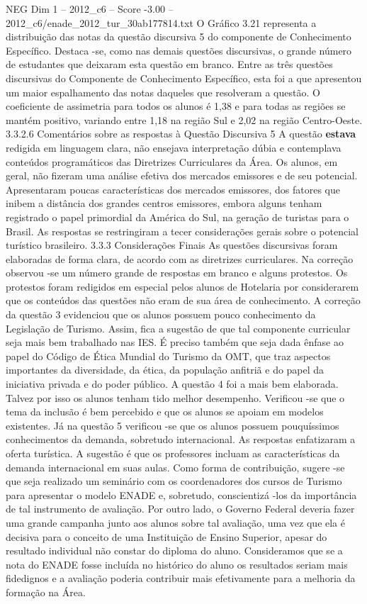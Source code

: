 \begin{textsample}{NEG Dim 1 – 2012\_c6 – Score -3.00 – 2012\_c6/enade\_2012\_tur\_30ab177814.txt}
O Gráfico 3.21 representa a distribuição das notas da questão discursiva 5 do componente de Conhecimento Específico.
Destaca -se, como nas demais questões discursivas, o grande número de estudantes que deixaram esta questão em branco.
Entre as três questões discursivas do Componente de Conhecimento Específico, esta foi a que apresentou um maior espalhamento das notas daqueles que resolveram a questão.
O coeficiente de assimetria para todos os alunos é 1,38 e para todas as regiões se mantém positivo, variando entre 1,18 na região Sul e 2,02 na região Centro-Oeste. 3.3.2.6 Comentários sobre as respostas à Questão Discursiva 5 A questão \textbf{estava} redigida em linguagem clara, não ensejava interpretação dúbia e contemplava conteúdos programáticos das Diretrizes Curriculares da Área.
Os alunos, em geral, não fizeram uma análise efetiva dos mercados emissores e de seu potencial.
Apresentaram poucas características dos mercados emissores, dos fatores que inibem a distância dos grandes centros emissores, embora alguns tenham registrado o papel primordial da América do Sul, na geração de turistas para o Brasil.
As respostas se restringiram a tecer considerações gerais sobre o potencial turístico brasileiro. 3.3.3 Considerações Finais As questões discursivas foram elaboradas de forma clara, de acordo com as diretrizes curriculares.
Na correção observou -se um número grande de respostas em branco e alguns protestos.
Os protestos foram redigidos em especial pelos alunos de Hotelaria por considerarem que os conteúdos das questões não eram de sua área de conhecimento.
A correção da questão 3 evidenciou que os alunos possuem pouco conhecimento da Legislação de Turismo.
Assim, fica a sugestão de que tal componente curricular seja mais bem trabalhado nas IES.
É preciso também que seja dada ênfase ao papel do Código de Ética Mundial do Turismo da OMT, que traz aspectos importantes da diversidade, da ética, da população anfitriã e do papel da iniciativa privada e do poder público.
A questão 4 foi a mais bem elaborada.
Talvez por isso os alunos tenham tido melhor desempenho.
Verificou -se que o tema da inclusão é bem percebido e que os alunos se apoiam em modelos existentes.
Já na questão 5 verificou -se que os alunos possuem pouquíssimos conhecimentos da demanda, sobretudo internacional.
As respostas enfatizaram a oferta turística.
A sugestão é que os professores incluam as características da demanda internacional em suas aulas.
Como forma de contribuição, sugere -se que seja realizado um seminário com os coordenadores dos cursos de Turismo para apresentar o modelo ENADE e, sobretudo, conscientizá -los da importância de tal instrumento de avaliação.
Por outro lado, o Governo Federal deveria fazer uma grande campanha junto aos alunos sobre tal avaliação, uma vez que ela é decisiva para o conceito de uma Instituição de Ensino Superior, apesar do resultado individual não constar do diploma do aluno.
Consideramos que se a nota do ENADE fosse incluída no histórico do aluno os resultados seriam mais fidedignos e a avaliação poderia contribuir mais efetivamente para a melhoria da formação na Área.

\end{textsample}

